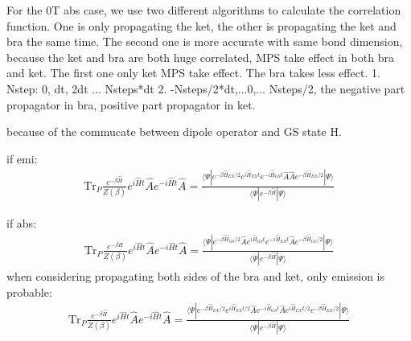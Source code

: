 \documentclass[a4paper,11pt]{ctexart}
\begin{document}
For the 0T abs case, we use two different algorithms to calculate the
correlation function. One is only propagating the ket, the other is propagating
the ket and bra the same time. The second one is more accurate with same bond
dimension, because the ket and bra are both huge correlated, MPS take effect in
both bra and ket. The first one only ket MPS take effect. The bra takes less
effect.
1. Nstep: 0, dt, 2dt ... Nsteps*dt
2. -Nsteps/2*dt,...0,... Nsteps/2, the negative part propagator in bra, positive
part propagator in ket.

because of the commucate between dipole operator and GS state H.

if emi:
\begin{gather}
    \textrm{Tr}_P \frac{e^{-\beta \hat{H}}}{Z(\beta)} e^{i\hat{H}t} \hat{A}
    e^{-i\hat{H}t} \hat{A} =  \frac{
        \langle \Psi | e^{-\beta \hat{H}_{EX} /2 } e^{i\hat{H}_{EX}t}
        e^{-i\hat{H}_{GS}t} \hat{A} 
    \hat{A}
    e^{-\beta \hat{H}_{EX} /2 } | \Psi \rangle  }{\langle \Psi | e^{-\beta \hat{H}} | \Psi \rangle}
\end{gather}

if abs:
\begin{gather}
    \textrm{Tr}_P \frac{e^{-\beta \hat{H}}}{Z(\beta)} e^{i\hat{H}t} \hat{A}
    e^{-i\hat{H}t} \hat{A} =  \frac{
        \langle \Psi | e^{-\beta \hat{H}_{GS} /2 } \hat{A} e^{i\hat{H}_{GS}t}
        e^{-i\hat{H}_{EX}t}
    \hat{A}
    e^{-\beta \hat{H}_{GS} /2 } | \Psi \rangle  }{\langle \Psi | e^{-\beta \hat{H}} | \Psi \rangle}
\end{gather}
when considering propagating both sides of the bra and ket, only emission is
probable:
\begin{gather}
    \textrm{Tr}_P \frac{e^{-\beta \hat{H}}}{Z(\beta)} e^{i\hat{H}t} \hat{A}
    e^{-i\hat{H}t} \hat{A} =  \frac{
        \langle \Psi | e^{-\beta \hat{H}_{EX} /2 } e^{i\hat{H}_{EX}t/2}
        \hat{A} e^{-i\hat{H}_{GS}t}  
    \hat{A} e^{i\hat{H}_{EX}t/2}
    e^{-\beta \hat{H}_{EX} /2 } | \Psi \rangle  }{\langle \Psi | e^{-\beta \hat{H}} | \Psi \rangle}
\end{gather}
\end{document}
